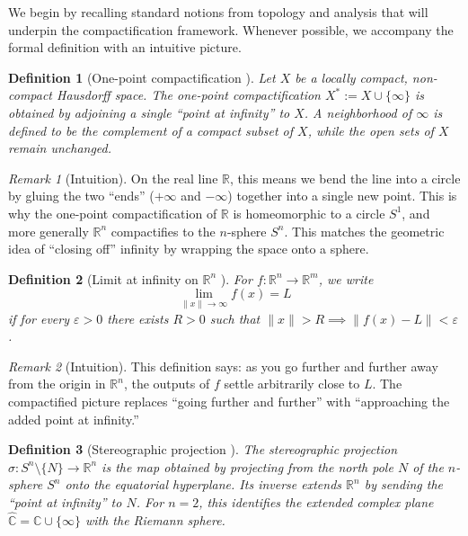 \documentclass[12pt]{article}
\newtheorem{definition}{Definition}
\theoremstyle{remark}
\newtheorem*{remark}{Remark}
\begin{document}
We begin by recalling standard notions from topology and analysis that will 
underpin the compactification framework. Whenever possible, we accompany the 
formal definition with an intuitive picture.

\begin{definition}[One-point compactification {\citep{Munkres2000,Hatcher2002}}]
Let $X$ be a locally compact, non-compact Hausdorff space. The one-point 
compactification $X^* := X \cup \{\infty\}$ is obtained by adjoining a single 
“point at infinity” to $X$. A neighborhood of $\infty$ is defined to be the 
complement of a compact subset of $X$, while the open sets of $X$ remain 
unchanged.
\end{definition}

\begin{remark}[Intuition]
On the real line $\mathbb{R}$, this means we bend the line into a circle by 
gluing the two “ends” ($+\infty$ and $-\infty$) together into a single new point. 
This is why the one-point compactification of $\mathbb{R}$ is homeomorphic to a 
circle $S^1$, and more generally $\mathbb{R}^n$ compactifies to the $n$-sphere $S^n$. 
This matches the geometric idea of “closing off” infinity by wrapping the space 
onto a sphere.
\end{remark}

\begin{definition}[Limit at infinity on $\mathbb{R}^n$ {\citep{RudinRealComplex}}]
For $f:\mathbb{R}^n \to \mathbb{R}^m$, we write 
\[
\lim_{\|x\|\to \infty} f(x) = L
\]
if for every $\varepsilon > 0$ there exists $R > 0$ such that 
$\|x\| > R \implies \|f(x)-L\| < \varepsilon$. 
\end{definition}

\begin{remark}[Intuition]
This definition says: as you go further and further away from the origin in 
$\mathbb{R}^n$, the outputs of $f$ settle arbitrarily close to $L$. The compactified 
picture replaces “going further and further” with “approaching the added point at infinity.”
\end{remark}

\begin{definition}[Stereographic projection {\citep{Needham1997,AhlforsComplex}}]
The stereographic projection $\sigma : S^n \setminus \{N\} \to \mathbb{R}^n$ 
is the map obtained by projecting from the north pole $N$ of the $n$-sphere $S^n$ 
onto the equatorial hyperplane. Its inverse extends $\mathbb{R}^n$ by sending the 
“point at infinity” to $N$. For $n=2$, this identifies the extended complex plane 
$\hat{\mathbb{C}} = \mathbb{C}\cup\{\infty\}$ with the Riemann sphere.
\end{definition}
\end{document}
